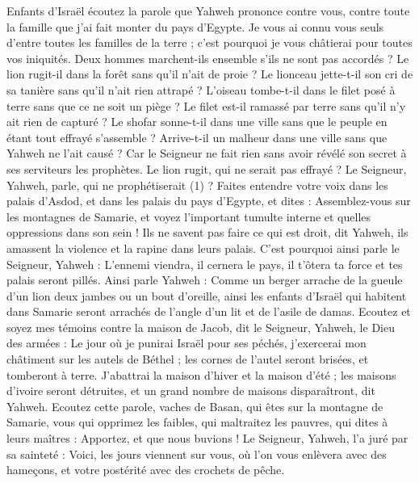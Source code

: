 \begin{multicols}{2}
\VerseOne{}Enfants d’Israël écoutez la parole que Yahweh prononce contre vous, contre toute la famille que j'ai fait monter du pays d'Egypte.
Je vous ai connu vous seuls d'entre toutes les familles de la terre ; c'est pourquoi je vous châtierai pour toutes vos iniquités.
Deux hommes marchent-ils ensemble s’ils ne sont pas accordés ?
Le lion rugit-il dans la forêt sans qu’il n'ait de proie ? Le lionceau jette-t-il son cri de sa tanière sans qu’il n'ait rien attrapé ?
L'oiseau tombe-t-il dans le filet posé à terre sans que ce ne soit un piège ? Le filet est-il ramassé par terre sans qu’il n’y ait rien de capturé ?
Le shofar sonne-t-il dans une ville sans que le peuple en étant tout effrayé s’assemble ? Arrive-t-il un malheur dans une ville sans que Yahweh ne l’ait causé ?
Car le Seigneur ne fait rien sans avoir révélé son secret à ses serviteurs les prophètes.
Le lion rugit, qui ne serait pas effrayé ? Le Seigneur, Yahweh, parle, qui ne prophétiserait (1) ?
Faites entendre votre voix dans les palais d'Asdod, et dans les palais du pays d'Egypte, et dites : Assemblez-vous sur les montagnes de Samarie, et voyez l’important tumulte interne et quelles oppressions dans son sein !
Ils ne savent pas faire ce qui est droit, dit Yahweh, ils amassent la violence et la rapine dans leurs palais.
C'est pourquoi ainsi parle le Seigneur, Yahweh : L'ennemi viendra, il cernera le pays, il t'ôtera ta force et tes palais seront pillés.
Ainsi parle Yahweh : Comme un berger arrache de la gueule d'un lion deux jambes ou un bout d'oreille, ainsi les enfants d'Israël qui habitent dans Samarie seront arrachés de l’angle d’un lit et de l’asile de damas.
Ecoutez et soyez mes témoins contre la maison de Jacob, dit le Seigneur, Yahweh, le Dieu des armées :
Le jour où je punirai Israël pour ses péchés, j’exercerai mon châtiment sur les autels de Béthel ; les cornes de l'autel seront brisées, et tomberont à terre.
J’abattrai la maison d'hiver et la maison d'été ; les maisons d'ivoire seront détruites, et un grand nombre de maisons disparaîtront, dit Yahweh.
\VerseOne{}Ecoutez cette parole, vaches de Basan, qui êtes sur la montagne de Samarie, vous qui opprimez les faibles, qui maltraitez les pauvres, qui dites à leurs maîtres : Apportez, et que nous buvions !
Le Seigneur, Yahweh, l’a juré par sa sainteté : Voici, les jours viennent sur vous, où l’on vous enlèvera avec des hameçons, et votre postérité avec des crochets de pêche.

\end{multicols}
